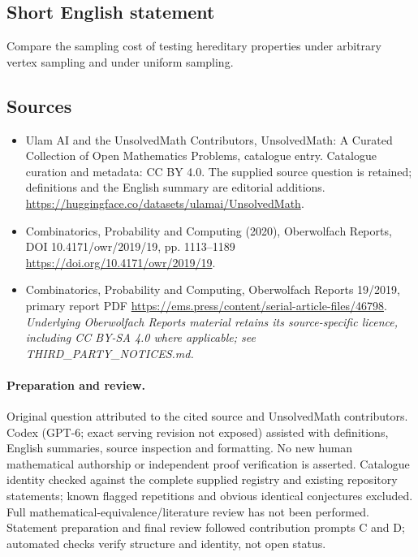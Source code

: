 \documentclass[11pt]{article}
\begin{document}
\subsection{Short English statement}
Compare the sampling cost of testing hereditary properties under arbitrary vertex sampling and under uniform sampling.
\subsection{Sources}
\begin{itemize}
\item[\hypertarget{source:statement:1}{S1}] Ulam AI and the UnsolvedMath Contributors, UnsolvedMath: A Curated Collection of Open Mathematics Problems, catalogue entry. Catalogue curation and metadata: CC BY 4.0. The supplied source question is retained; definitions and the English summary are editorial additions.
\url{https://huggingface.co/datasets/ulamai/UnsolvedMath}.
\item[\hypertarget{source:statement:2}{S2}] Combinatorics, Probability and Computing (2020), Oberwolfach Reports, DOI 10.4171/owr/2019/19, pp. 1113--1189
\url{https://doi.org/10.4171/owr/2019/19}.
\item[\hypertarget{source:statement:3}{S3}] Combinatorics, Probability and Computing, Oberwolfach Reports 19/2019, primary report PDF
\url{https://ems.press/content/serial-article-files/46798}.
\textit{Underlying Oberwolfach Reports material retains its source-specific licence, including CC BY-SA 4.0 where applicable; see THIRD\_PARTY\_NOTICES.md.}
\end{itemize}
\paragraph{Preparation and review.}
Original question attributed to the cited source and UnsolvedMath contributors. Codex (GPT-6; exact serving revision not exposed) assisted with definitions, English summaries, source inspection and formatting. No new human mathematical authorship or independent proof verification is asserted. Catalogue identity checked against the complete supplied registry and existing repository statements; known flagged repetitions and obvious identical conjectures excluded. Full mathematical-equivalence/literature review has not been performed. Statement preparation and final review followed contribution prompts C and D; automated checks verify structure and identity, not open status.
\label{end:statement}
\end{document}
